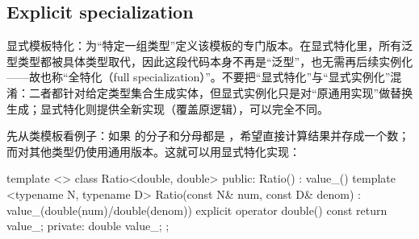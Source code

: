 \subsection{Explicit specialization}
显式模板特化：为“特定一组类型”定义该模板的专门版本。在显式特化里，所有泛型类型都被具体类型取代，因此这段代码本身不再是“泛型”，也无需再后续实例化——故也称“全特化（full specialization）”。不要把“显式特化”与“显式实例化”混淆：二者都针对给定类型集合生成实体，但显式实例化只是对“原通用实现”做替换生成；显式特化则提供全新实现（覆盖原逻辑），可以完全不同。

先从类模板看例子：如果  的分子和分母都是 ，希望直接计算结果并存成一个数；而对其他类型仍使用通用版本。这就可以用显式特化实现：

\begin{code}
template <> class Ratio<double, double> {
  public:
  Ratio() : value_() {}
  template <typename N, typename D>
    Ratio(const N& num, const D& denom) :
      value_(double(num)/double(denom)) {}
  explicit operator double() const { return value_; }
  private:
  double value_;
};
\end{code}

